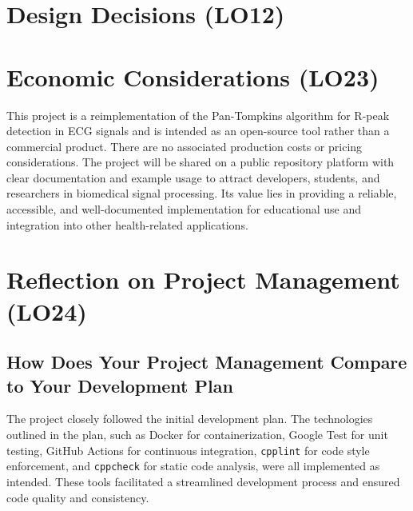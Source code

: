 \documentclass{article}
\begin{document}


\section{Design Decisions (LO12)}


\section{Economic Considerations (LO23)}

This project is a reimplementation of the Pan-Tompkins algorithm for R-peak
detection in ECG signals and is intended as an open-source tool rather than a
commercial product. There are no associated production costs or pricing
considerations. The project will be shared on a public repository platform with
clear documentation and example usage to attract developers, students, and
researchers in biomedical signal processing. Its value lies in providing a
reliable, accessible, and well-documented implementation for educational use and
integration into other health-related applications.

\section{Reflection on Project Management (LO24)}

\subsection{How Does Your Project Management Compare to Your Development Plan}

The project closely followed the initial development plan. The technologies
outlined in the plan, such as Docker for containerization, Google Test for unit
testing, GitHub Actions for continuous integration, \texttt{cpplint} for code
style enforcement, and \texttt{cppcheck} for static code analysis, were all
implemented as intended. These tools facilitated a streamlined development
process and ensured code quality and consistency.
\end{document}
